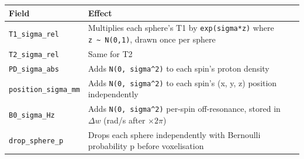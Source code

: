 \begingroup
\def\augmentFieldWidth{0.25\columnwidth}
\def\augmentEffectWidth{0.70\columnwidth}
\begin{longtable}[]{@{}ll@{}}
\toprule
\begin{minipage}[b]{\augmentFieldWidth}\raggedright
Field\strut
\end{minipage} & \begin{minipage}[b]{\augmentEffectWidth}\raggedright
Effect\strut
\end{minipage}\tabularnewline
\midrule
\endhead
\begin{minipage}[t]{\augmentFieldWidth}\raggedright
\texttt{T1\_sigma\_rel}\strut
\end{minipage} & \begin{minipage}[t]{\augmentEffectWidth}\raggedright
Multiplies each sphere's T1 by \texttt{exp(sigma*z)} where
\texttt{z\ \textasciitilde{}\ N(0,1)}, drawn once per sphere\strut
\end{minipage}\tabularnewline
\begin{minipage}[t]{\augmentFieldWidth}\raggedright
\texttt{T2\_sigma\_rel}\strut
\end{minipage} & \begin{minipage}[t]{\augmentEffectWidth}\raggedright
Same for T2\strut
\end{minipage}\tabularnewline
\begin{minipage}[t]{\augmentFieldWidth}\raggedright
\texttt{PD\_sigma\_abs}\strut
\end{minipage} & \begin{minipage}[t]{\augmentEffectWidth}\raggedright
Adds \texttt{N(0,\ sigma\^{}2)} to each spin's proton density\strut
\end{minipage}\tabularnewline
\begin{minipage}[t]{\augmentFieldWidth}\raggedright
\texttt{position\_sigma\_mm}\strut
\end{minipage} & \begin{minipage}[t]{\augmentEffectWidth}\raggedright
Adds \texttt{N(0,\ sigma\^{}2)} to each spin's (x, y, z) position
independently\strut
\end{minipage}\tabularnewline
\begin{minipage}[t]{\augmentFieldWidth}\raggedright
\texttt{B0\_sigma\_Hz}\strut
\end{minipage} & \begin{minipage}[t]{\augmentEffectWidth}\raggedright
Adds \texttt{N(0,\ sigma\^{}2)} per-spin off-resonance, stored in \(\Delta w\)
(rad/s after \(\times 2\pi\))\strut
\end{minipage}\tabularnewline
\begin{minipage}[t]{\augmentFieldWidth}\raggedright
\texttt{drop\_sphere\_p}\strut
\end{minipage} & \begin{minipage}[t]{\augmentEffectWidth}\raggedright
Drops each sphere independently with Bernoulli probability p before
voxelisation\strut
\end{minipage}\tabularnewline
\bottomrule
\end{longtable}
\endgroup

